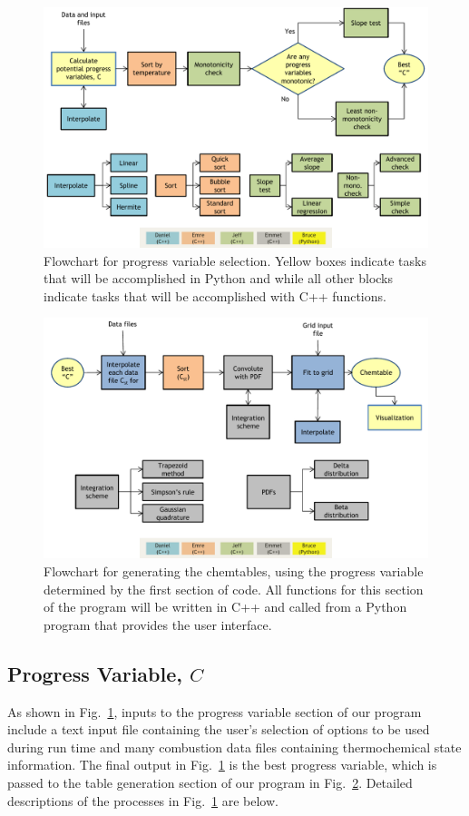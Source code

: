 \documentclass[11pt]{article}
\begin{document}
\begin{figure} [h]
\centering
\includegraphics[width=\textwidth]{diagram_1_shortened_v3}
\caption{\label{fig:flow1} Flowchart for progress variable selection. Yellow boxes indicate tasks that will be accomplished in Python and while all other blocks indicate tasks that will be accomplished with C++ functions.}
\end{figure}

\begin{figure} [h]
\centering
\includegraphics[width=\textwidth]{diagram_2_shortened_v3}
\caption{\label{fig:flow2} Flowchart for generating the chemtables, using the progress variable  determined by the first section of code. All functions for this section of the program will be written in C++ and called from a Python program that provides the user interface.}
\end{figure}

\subsection{Progress Variable, $C$}
As shown in Fig.~\ref{fig:flow1}, inputs to the progress variable section of our program include a text input file containing the user’s selection of options to be used during run time and many combustion data files containing thermochemical state information. The final output in Fig.~\ref{fig:flow1} is the best progress variable, which is passed to the table generation section of our program in Fig.~\ref{fig:flow2}. Detailed descriptions of the processes in Fig.~\ref{fig:flow1} are below.
\end{document}
